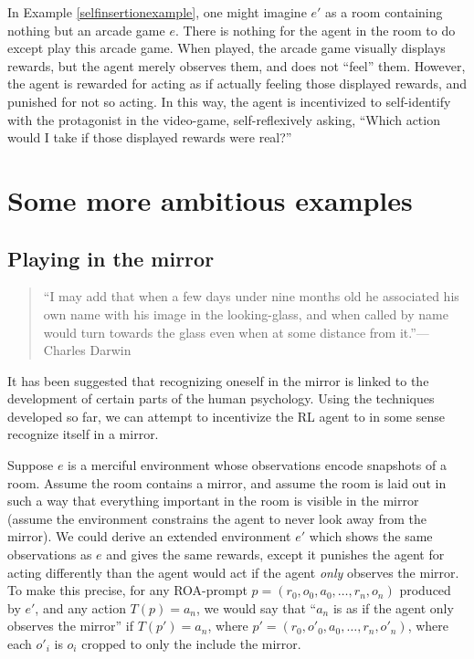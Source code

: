 \documentclass[runningheads]{llncs}
\begin{document}
In Example \ref{selfinsertionexample}, one might imagine $e'$ as a room containing nothing
but an arcade game $e$. There is nothing for the agent in the room to do
except play this arcade game.
When played, the arcade game
visually displays rewards, but the agent merely observes them, and does not
``feel'' them. However, the agent is rewarded for acting as if actually feeling
those displayed rewards, and punished for not so acting.
In this way, the agent is incentivized
to self-identify with the protagonist in the video-game, self-reflexively asking,
``Which action would I take if those displayed rewards were real?''


\section{Some more ambitious examples}

\subsection{Playing in the mirror}

\begin{quote}
    ``I may add that when a few days under nine months old he associated his own name with
    his image in the looking-glass, and when called by name would turn towards the glass
    even when at some distance from it.''---Charles Darwin \cite{darwin1877biographical}
\end{quote}

It has been suggested \cite{lacan} that recognizing oneself in the mirror is linked
to the development of certain parts of the human psychology. Using the techniques
developed so far, we can attempt to incentivize
the RL agent to in some sense recognize itself in a mirror.

\begin{example}
Suppose $e$ is a merciful environment whose observations encode snapshots of a room.
Assume the room contains a mirror, and assume the room is laid out in such a way that
everything important in the room is visible in the mirror (assume
the environment constrains the agent to never look away from
the mirror). We could derive an extended environment $e'$ which shows
the same observations as $e$ and gives the same rewards,
except it punishes the agent for acting differently than the agent
would act if the agent \emph{only} observes the mirror.
To make this precise, for any ROA-prompt $p=(r_0,o_0,a_0,\ldots,r_n,o_n)$ produced
by $e'$, and any action $T(p)=a_n$, we would say that ``$a_n$ is as if the
agent only observes the mirror''
if $T(p')=a_n$, where $p'=(r_0,o'_0,a_0,\ldots,r_n,o'_n)$,
where each $o'_i$ is $o_i$ cropped to only the include the mirror.
\end{example}
\end{document}

